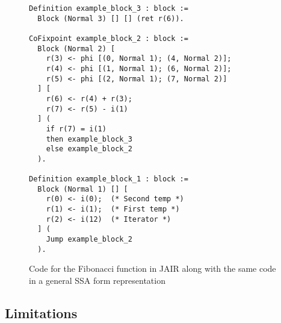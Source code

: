 \begin{figure}[ht]
\centering
\begin{minipage}{0.65\textwidth}
\begin{lstlisting}[style=Rocq]
Definition example_block_3 : block :=
  Block (Normal 3) [] [] (ret r(6)).

CoFixpoint example_block_2 : block :=
  Block (Normal 2) [
    r(3) <- phi [(0, Normal 1); (4, Normal 2)];
    r(4) <- phi [(1, Normal 1); (6, Normal 2)];
    r(5) <- phi [(2, Normal 1); (7, Normal 2)]
  ] [
    r(6) <- r(4) + r(3);
    r(7) <- r(5) - i(1)
  ] (
    if r(7) = i(1)
    then example_block_3
    else example_block_2
  ).

Definition example_block_1 : block :=
  Block (Normal 1) [] [
    r(0) <- i(0);  (* Second temp *)
    r(1) <- i(1);  (* First temp *)
    r(2) <- i(12)  (* Iterator *)
  ] (
    Jump example_block_2
  ).
\end{lstlisting}
\end{minipage}
\hfill
\begin{minipage}{0.30\textwidth}
\centering
{}
\end{minipage}
\caption{Code for the Fibonacci function in JAIR along with the same code in a general SSA form representation}
\label{fig:example-jair}
\end{figure}

\subsection{Limitations}
\label{subsec:limitations}

